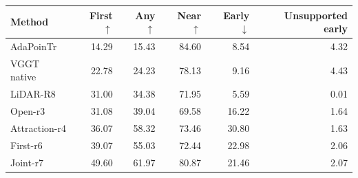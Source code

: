 \begin{tabular}{lrrrrr}
\toprule
Method & First $\uparrow$ & Any $\uparrow$ & Near $\uparrow$ & Early $\downarrow$ & Unsupported early \\
\midrule
AdaPoinTr & 14.29 & 15.43 & 84.60 & 8.54 & 4.32 \\
VGGT native & 22.78 & 24.23 & 78.13 & 9.16 & 4.43 \\
LiDAR-R8 & 31.00 & 34.38 & 71.95 & 5.59 & 0.01 \\
Open-r3 & 31.08 & 39.04 & 69.58 & 16.22 & 1.64 \\
Attraction-r4 & 36.07 & 58.32 & 73.46 & 30.80 & 1.63 \\
First-r6 & 39.07 & 55.03 & 72.44 & 22.98 & 2.06 \\
Joint-r7 & 49.60 & 61.97 & 80.87 & 21.46 & 2.07 \\
\bottomrule
\end{tabular}
